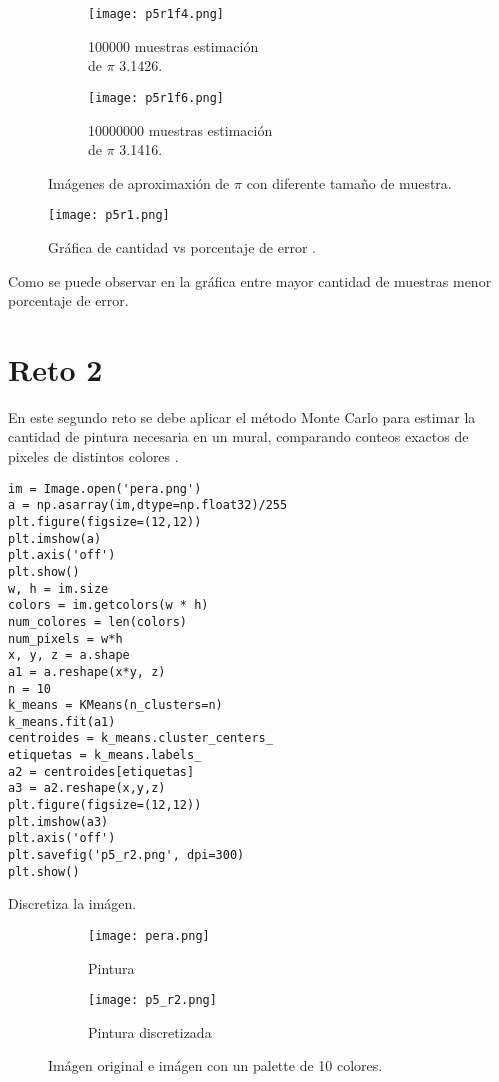 \documentclass{article}
\begin{document}
\begin{figure}[H]
\centering
\begin{subfigure}[b]{0.35\linewidth}
\texttt{[image: p5r1f4.png]}
\caption{100000 muestras estimación\\ de $\pi$ 3.1426.}
\end{subfigure}
\begin{subfigure}[b]{0.35\linewidth}
\texttt{[image: p5r1f6.png]}
\caption{10000000 muestras estimación\\ de $\pi$ 3.1416.}
\end{subfigure}
\caption{Imágenes de aproximaxión de $\pi$ con diferente tamaño de muestra.}
\label{fig:westminster}
\end{figure}

\begin{figure}[H]
\centering
\texttt{[image: p5r1.png]}
\caption{\label{fig3} Gráfica de cantidad vs porcentaje de error .}
\end{figure}

Como se puede observar en la gráfica entre mayor cantidad de muestras menor porcentaje de error.

\section{Reto 2}
En este segundo reto se debe aplicar el método Monte Carlo para estimar la cantidad de pintura necesaria en un mural, comparando conteos exactos de pixeles de distintos colores \cite{Satu_Elisa_Schaeffer}. 

\renewcommand{\listingscaption}{Código}
\begin{listing}[H]
  \begin{verbatim}
im = Image.open('pera.png')
a = np.asarray(im,dtype=np.float32)/255
plt.figure(figsize=(12,12))
plt.imshow(a)
plt.axis('off')
plt.show()
w, h = im.size
colors = im.getcolors(w * h)
num_colores = len(colors) 
num_pixels = w*h
x, y, z = a.shape
a1 = a.reshape(x*y, z)
n = 10
k_means = KMeans(n_clusters=n)
k_means.fit(a1)
centroides = k_means.cluster_centers_
etiquetas = k_means.labels_
a2 = centroides[etiquetas]
a3 = a2.reshape(x,y,z)
plt.figure(figsize=(12,12))
plt.imshow(a3)
plt.axis('off')
plt.savefig('p5_r2.png', dpi=300)
plt.show()
        \end{verbatim}
  \label{lst:fibo}
  \caption{Discretiza la imágen.}
\end{listing}

\begin{figure}[H]
\centering
\begin{subfigure}[b]{0.35\linewidth}
\texttt{[image: pera.png]}
\caption{Pintura }
\end{subfigure}
\begin{subfigure}[b]{0.35\linewidth}
\texttt{[image: p5\_r2.png]}
\caption{Pintura discretizada}
\end{subfigure}
\caption{Imágen original e imágen con un palette de 10 colores.}
\label{fig:westminster}
\end{figure}
\end{document}
